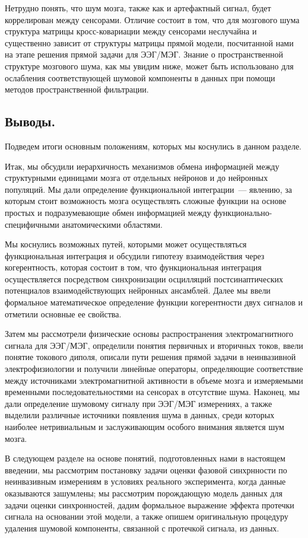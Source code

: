 Нетрудно понять, что шум мозга, также как и артефактный сигнал, будет коррелирован между сенсорами.
Отличие состоит в том, что для мозгового шума структура матрицы кросс-ковариации между сенсорами
неслучайна и существенно зависит от структуры матрицы прямой модели,
посчитанной нами на этапе решения прямой задачи для ЭЭГ/МЭГ.
Знание о пространственной структуре мозгового шума, как мы увидим ниже, может быть использовано для
ослабления соответствующей шумовой компоненты в данных при помощи методов пространственной фильтрации.

\subsection{Выводы.}
Подведем итоги основным положениям, которых мы коснулись в данном разделе.

Итак, мы обсудили иерархичность механизмов обмена информацией между структурными единицами
мозга от отдельных нейронов и до нейронных популяций.
Мы дали определение функциональной интеграции~--- явлению, за которым стоит возможность мозга
осуществлять сложные функции на основе простых и подразумевающие обмен информацией между
функционально-специфичными анатомическими областями.

Мы коснулись возможных путей, которыми может осуществляться функциональная интеграция и
обсудили гипотезу взаимодействия через когерентность, которая состоит в том, что
функциональная интеграция осуществляется посредством синхронизации осцилляций постсинаптических
потенциалов взаимодействующих нейронных ансамблей. Далее мы ввели формальное математическое
определение функции когерентности двух сигналов и отметили основные ее свойства.

Затем мы рассмотрели физические основы распространения электромагнитного сигнала для ЭЭГ/МЭГ,
определили понятия первичных и вторичных токов, ввели понятие токового диполя,
описали пути решения прямой задачи в неинвазивной электрофизиологии и получили
линейные операторы, определяющие соответствие между источниками электромагнитной активности
в объеме мозга и измеряемыми временными последовательностями на сенсорах в отсутствие шума.
Наконец, мы дали определение шумовому сигналу при ЭЭГ/МЭГ измерениях, а также выделили
различные источники появления шума в данных, среди которых наиболее нетривиальным и заслуживающим
особого внимания является шум мозга.

В следующем разделе на основе понятий, подготовленных нами в настоящем введении, мы рассмотрим
постановку задачи оценки фазовой синхрнности по неинвазивным измерениям в условиях реального
эксперимента, когда данные оказываются зашумлены; мы рассмотрим порождающую модель данных для
задачи оценки синхронностей, дадим формальное выражение эффекта протечки сигнала на основании
этой модели, а также опишем оригинальную процедуру удаления шумовой компоненты, связанной
с протечкой сигнала, из данных.




